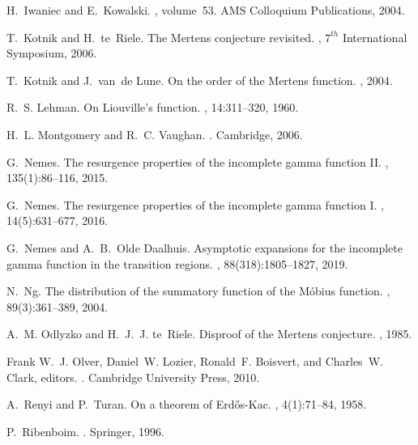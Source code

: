 \documentclass[11pt,reqno,a4letter]{article}
\numberwithin{figure}{section}
\numberwithin{table}{section}
\theoremstyle{plain}
\numberwithin{theorem}{section}
\theoremstyle{definition}
\begin{document}
\begin{thebibliography}{10}
H.~Iwaniec and E.~Kowalski.
, volume~53.
\newblock AMS Colloquium Publications, 2004.

T.~Kotnik and H.~te~Riele.
\newblock The {M}ertens conjecture revisited.
, $7^{th}$ International Symposium,
  2006.

T.~Kotnik and J.~van~de Lune.
\newblock On the order of the {M}ertens function.
, 2004.

R.~S. Lehman.
\newblock On {L}iouville's function.
, 14:311--320, 1960.

H.~L. Montgomery and R.~C. Vaughan.
.
\newblock Cambridge, 2006.

G.~Nemes.
\newblock The resurgence properties of the incomplete gamma function {II}.
, 135(1):86--116, 2015.

G.~Nemes.
\newblock The resurgence properties of the incomplete gamma function {I}.
, 14(5):631--677, 2016.

G.~Nemes and A.~B.~Olde Daalhuis.
\newblock Asymptotic expansions for the incomplete gamma function in the
  transition regions.
, 88(318):1805--1827, 2019.

N.~Ng.
\newblock The distribution of the summatory function of the {M}{\'{o}}bius
  function.
, 89(3):361--389, 2004.

A.~M. Odlyzko and H.~J.~J. te~Riele.
\newblock Disproof of the {M}ertens conjecture.
, 1985.

Frank W.~J. Olver, Daniel~W. Lozier, Ronald~F. Boisvert, and Charles~W. Clark,
  editors.
.
\newblock Cambridge University Press, 2010.

A.~Renyi and P.~Turan.
\newblock On a theorem of {E}rd{\H{o}}s-{K}ac.
, 4(1):71--84, 1958.

P.~Ribenboim.
.
\newblock Springer, 1996.


\end{thebibliography}
\end{document}
